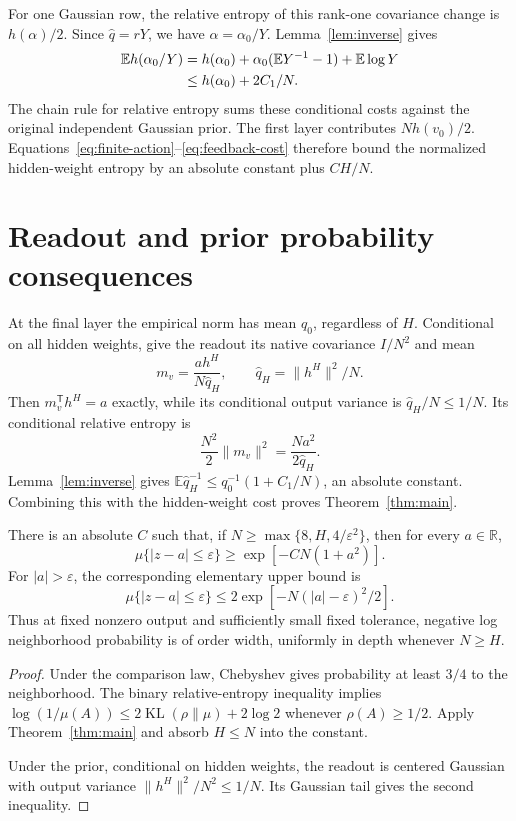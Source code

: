 \documentclass[11pt]{article}
\newcommand{\E}{\mathbb E}\newcommand{\R}{\mathbb R}\newcommand{\KL}{\operatorname{KL}}
\begin{document}
For one Gaussian row, the relative entropy of this rank-one covariance change is $h(\alpha)/2$. Since $\widehat q=rY$, we have $\alpha=\alpha_0/Y$. Lemma~\ref{lem:inverse} gives
\begin{align}
 \E h(\alpha_0/Y)
 &=h(\alpha_0)+\alpha_0(\E Y^{-1}-1)+\E\log Y\notag\\
 &\le h(\alpha_0)+2C_1/N.
 \label{eq:feedback-cost}
\end{align}
The chain rule for relative entropy sums these conditional costs against the original independent Gaussian prior. The first layer contributes $Nh(v_0)/2$. Equations~\eqref{eq:finite-action}--\eqref{eq:feedback-cost} therefore bound the normalized hidden-weight entropy by an absolute constant plus $C H/N$.

\section{Readout and prior probability consequences}
At the final layer the empirical norm has mean $q_0$, regardless of $H$. Conditional on all hidden weights, give the readout its native covariance $I/N^2$ and mean
\[
 m_v=\frac{a h^H}{N\widehat q_H},\qquad
 \widehat q_H=\|h^H\|^2/N.
\]
Then $m_v^{\mathsf T}h^H=a$ exactly, while its conditional output variance is $\widehat q_H/N\le1/N$. Its conditional relative entropy is
\[
 \frac{N^2}2\|m_v\|^2=\frac{Na^2}{2\widehat q_H}.
\]
Lemma~\ref{lem:inverse} gives
$\E\widehat q_H^{-1}\le q_0^{-1}(1+C_1/N)$, an absolute constant. Combining this with the hidden-weight cost proves Theorem~\ref{thm:main}.

\begin{corollary}
\label{cor:probability}
There is an absolute $C$ such that, if $N\ge\max\{8,H,4/\varepsilon^2\}$, then for every $a\in\R$,
\[
 \mu\{|z-a|\le\varepsilon\}\ge\exp[-CN(1+a^2)].
\]
For $|a|>\varepsilon$, the corresponding elementary upper bound is
\[
 \mu\{|z-a|\le\varepsilon\}
 \le2\exp[-N(|a|-\varepsilon)^2/2].
\]
Thus at fixed nonzero output and sufficiently small fixed tolerance, negative log neighborhood probability is of order width, uniformly in depth whenever $N\ge H$.
\end{corollary}
\begin{proof}
Under the comparison law, Chebyshev gives probability at least $3/4$ to the neighborhood. The binary relative-entropy inequality implies
$\log(1/\mu(A))\le2\KL(\rho\|\mu)+2\log2$ whenever $\rho(A)\ge1/2$. Apply Theorem~\ref{thm:main} and absorb $H\le N$ into the constant.

Under the prior, conditional on hidden weights, the readout is centered Gaussian with output variance $\|h^H\|^2/N^2\le1/N$. Its Gaussian tail gives the second inequality.
\end{proof}
\end{document}
